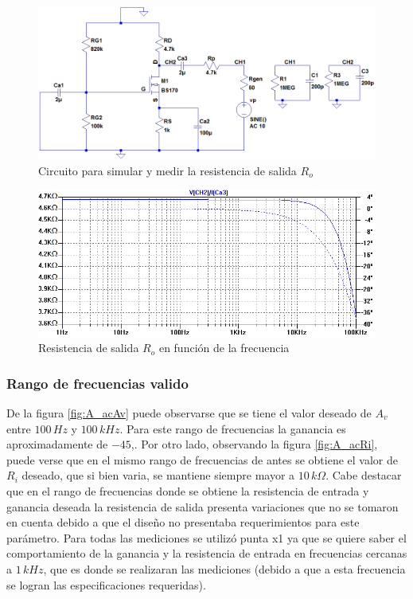 \documentclass[10pt,spanish,a4paper,notitlepage]{article}
\begin{document}
\begin{figure}[H]
\centering
\includegraphics[scale=0.6]{circuitos/A_simuRo.png}
\caption{Circuito para simular y medir la resistencia de salida $R_o$}
\label{fig:A_simuRo}
\end{figure}

\begin{figure}[H]
\centering
\includegraphics[scale=0.75]{simulaciones/A_acRo.png}
\caption{Resistencia de salida $R_o$ en función de la frecuencia}
\label{fig:A_acRo}
\end{figure}


\subsubsection{Rango de frecuencias valido}
De la figura \ref{fig:A_acAv} puede observarse que se tiene el valor deseado de $A_v$ entre $100\,\unit{Hz}$ y $100\,\unit{kHz}$. Para este rango de frecuencias la ganancia es aproximadamente de $-45$,. Por otro lado, observando la figura \ref{fig:A_acRi}, puede verse que en el mismo rango de frecuencias de antes se obtiene el valor de $R_i$ deseado, que si bien varia, se mantiene siempre mayor a $10\,\unit{k\Omega}$. Cabe destacar que en el rango de frecuencias donde se obtiene la resistencia de entrada y ganancia deseada la resistencia de salida presenta variaciones que no se tomaron en cuenta debido a que el diseño no presentaba requerimientos para este parámetro. Para todas las mediciones se utilizó punta x1 ya que se quiere saber el comportamiento de la ganancia y la resistencia de entrada en frecuencias cercanas a $1\,\unit{kHz}$, que es donde se realizaran las mediciones (debido a que a esta frecuencia se logran las especificaciones requeridas).
\end{document}
